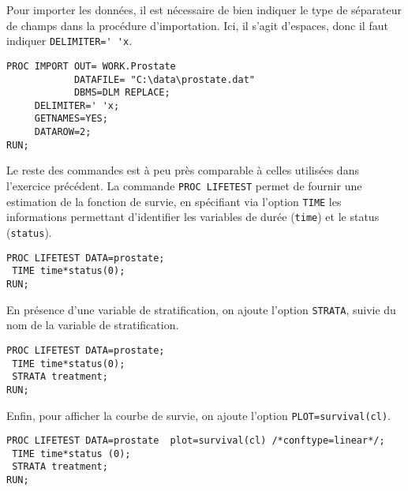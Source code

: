 %
%
%
\soln{\ref{exo:11.2}} 
Pour importer les données, il est nécessaire de bien indiquer le type de
séparateur de champs dans la procédure d'importation. Ici, il s'agit
d'espaces, donc il faut indiquer \verb|DELIMITER=' 'x|.
\begin{verbatim}
PROC IMPORT OUT= WORK.Prostate
            DATAFILE= "C:\data\prostate.dat"
            DBMS=DLM REPLACE;
     DELIMITER=' 'x;
     GETNAMES=YES;
     DATAROW=2;
RUN;
\end{verbatim}
Le reste des commandes est à peu près comparable à celles utilisées dans
l'exercice précédent. La commande \verb|PROC LIFETEST| permet de fournir une
estimation de la fonction de survie, en spécifiant via l'option \verb|TIME|
les informations permettant d'identifier les variables de durée
(\texttt{time}) et le status (\texttt{status}).
\begin{verbatim}
PROC LIFETEST DATA=prostate;
 TIME time*status(0);
RUN;
\end{verbatim}

En présence d'une variable de stratification, on ajoute l'option
\verb|STRATA|, suivie du nom de la variable de stratification.
\begin{verbatim}
PROC LIFETEST DATA=prostate;
 TIME time*status(0);
 STRATA treatment;
RUN;
\end{verbatim}

Enfin, pour afficher la courbe de survie, on ajoute l'option
\verb|PLOT=survival(cl)|. 
\begin{verbatim}
PROC LIFETEST DATA=prostate  plot=survival(cl) /*conftype=linear*/;
 TIME time*status (0);
 STRATA treatment;
RUN;
\end{verbatim}
\label{stop:sol11b}
